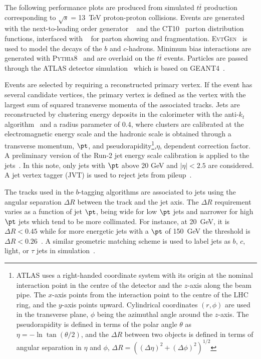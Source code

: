The following performance plots are produced from simulated $t\bar{t}$ production corresponding to $\sqrt{s}=$13~TeV proton-proton collisions.
Events are generated with the next-to-leading order generator \powheg{}~\cite{bib:powheg} and the \textsc{CT10}~\cite{Lai:2010vv} parton distribution functions, interfaced with \pythia{}~\cite{pythia2} for parton showing and fragmentation. \textsc{EvtGen}~\cite{Lange:2001uf} is used to model the decays of the $b$ and $c$-hadrons. Minimum bias interactions are generated with \textsc{Pythia8}~\cite{Pythia8} and are overlaid on the $t\bar{t}$ events. Particles are passed through the ATLAS detector simulation~\cite{atlas_simulation} which is based on \textsc{GEANT4}~\cite{geant}.


Events are selected by requiring a reconstructed primary vertex. If the event has several candidate vertices, the primary vertex is defined as the vertex with the largest sum of squared transverse momenta of the associated tracks. Jets are reconstructed by clustering energy deposits in the calorimeter with the anti-$k_t$ algorithm~\cite{AntiKt} and a radius parameter of 0.4, where clusters are calibrated at the electromagnetic  energy scale and the hadronic scale is obtained through a transverse momentum, $\pt$, and pseudorapidity\footnote{ATLAS uses a right-handed coordinate system with its origin at the nominal interaction point in the centre of the detector and the $z$-axis along the beam pipe. The $x$-axis points from the interaction point to the centre of the LHC ring, and the $y$-axis points upward. Cylindrical coordinates $(r,\phi)$ are used in the transverse plane, $\phi$ being the azimuthal angle around the $z$-axis. The pseudorapidity is defined in terms of the polar angle $\theta$ as $\eta=-\ln\tan(\theta/2)$, and the $\Delta R$ between two objects is defined in terms of angular separation in $\eta$ and $\phi$, $\Delta R = ((\Delta \eta)^2 + (\Delta \phi)^2)^{1/2}$},$\eta$, dependent correction factor. A preliminary version of the Run-2 jet energy scale calibration is applied to the jets~\cite{JES}. In this note, only jets with $\pt$ above 20 GeV and $|\eta| < 2.5$ are considered.
A jet vertex tagger (JVT) is used to reject jets from pileup~\cite{JVT}.

The tracks used in the $b$-tagging algorithms are associated to jets
using the angular separation $\Delta R$ between the track and the jet axis. The $\Delta R$ requirement varies as a
function of jet $\pt$, being wide for low $\pt$ jets and narrower for high $\pt$ jets which tend to be more
collimated. For instance, at 20~GeV, it is $\Delta R<0.45$ while for more energetic jets with a $\pt$ of 150~GeV the
threshold is $\Delta R<0.26$~\cite{ref:btagPaper}.
A similar geometric matching scheme is used to label jets as $b$, $c$, light, or $\tau$ jets in simulation~\cite{ATL-PHYS-PUB-2015-022}.

